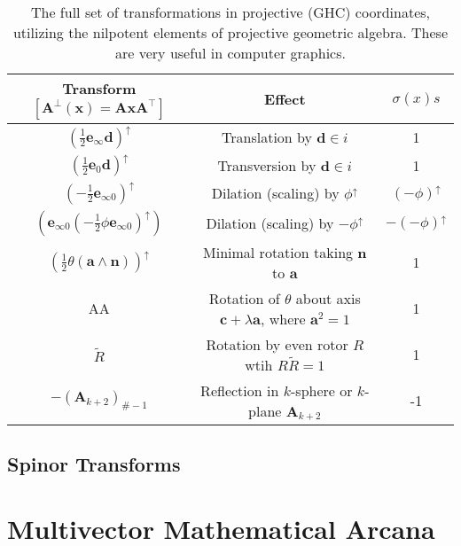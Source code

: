 \documentclass[a4paper]{book}
\numberwithin{equation}{chapter}
\begin{document}
\begin{table}[h]
\centering
\begin{tabular}{|c|c|c|}
\hline
\cellcolor[HTML]{CBCEFB}Transform $[\mathbf{A}^\bot \mathbf{(x)}=\mathbf{AxA^\top}]$ &
  \cellcolor[HTML]{BCA3B7}Effect &
  \cellcolor[HTML]{FFFC9E}$\sigma(x)s$ \\ \hline
\rowcolor[HTML]{FFFFFF} 
$\left ( \frac{1}{2}\mathbf{e}_{\infty}\mathbf{d}\right )^\uparrow$ &
  Translation by $\mathbf{d}\in i$ &
  1 \\ \hline
\rowcolor[HTML]{EFEFEF} 
$\left ( \frac{1}{2}\mathbf{e}_0\mathbf{d}\right )^\uparrow$ &
  Transversion by $\mathbf{d}\in i$ &
  1 \\ \hline
\rowcolor[HTML]{FFFFFF} 
$\left (- \frac{1}{2}\mathbf{e}_{\infty0} \right)^\uparrow$ &
  Dilation (scaling) by $\phi^\uparrow$ &
  $(-\phi)^{\uparrow}$ \\ \hline
\rowcolor[HTML]{EFEFEF} 
\cellcolor[HTML]{EFEFEF}$\left ( \mathbf{e}_{\infty0} \left (  -\frac{1}{2}\phi \mathbf{e}_{\infty 0} \right )^\uparrow  \right )$ &
  Dilation (scaling) by $-\phi^\uparrow$ &
  $-(-\phi)^{\uparrow}$ \\ \hline
\rowcolor[HTML]{FFFFFF} 
$\left ( \frac{1}{2} \theta(\mathbf{a\wedge n}) \right )^\uparrow$ &
  Minimal rotation taking $\mathbf{n}$ to $\mathbf{a}$ &
  1 \\ \hline
\rowcolor[HTML]{EFEFEF} 
AA &
  Rotation of $\theta$ about axis $\mathbf{c}+\lambda\mathbf{a}$, where $\mathbf{a}^2=1$ &
  1 \\ \hline
\rowcolor[HTML]{FFFFFF} 
$\tilde{R}$ &
  Rotation by even rotor $R$ wtih $R\tilde{R}=1$ &
  1 \\ \hline
\rowcolor[HTML]{EFEFEF} 
$-(\mathbf{A}_{k+2})_{\#-1}$ &
  Reflection in $k$-sphere or $k$-plane $\mathbf{A}_{k+2}$ &
  -1 \\ \hline
\end{tabular}
\caption{The full set of transformations in projective (GHC) coordinates, utilizing the nilpotent elements of projective geometric algebra. These are very useful in computer graphics.}
\label{tab:my-table}
\end{table}
    
    \section{Spinor Transforms}
    

    
    \chapter{Multivector Mathematical Arcana}
\end{document}
